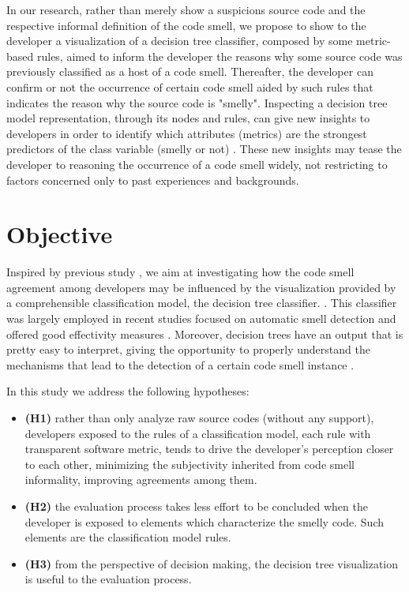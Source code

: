 In our research, rather than merely show a suspicions source code and the respective informal definition of the code smell, we propose to show to the developer a visualization of a decision tree classifier, composed by some metric-based rules, aimed to inform the developer the reasons why some source code was previously classified as a host of a code smell. Thereafter, the developer can confirm or not the occurrence of certain code smell aided by such rules that indicates the reason why the source code is "smelly". Inspecting a decision tree model representation, through its nodes and rules, can give new insights to developers in order to identify which attributes (metrics) are the strongest predictors of the class variable (smelly or not) \cite{freitas2014comprehensible}. These new insights may tease the developer to reasoning the occurrence of a code smell widely, not restricting to factors concerned only to past experiences and backgrounds.

\section{Objective}

Inspired by previous study \cite{hozano2018you}, we aim at investigating how the code smell agreement among developers may be influenced by the visualization provided by a comprehensible classification model, the decision tree classifier. \cite{freitas2014comprehensible}. This classifier was largely employed \cite{azeem2019machine} in recent studies focused on automatic smell detection and offered good effectivity measures \cite{amorim2015experience}.  Moreover, decision trees have an output that is pretty easy to interpret, giving the opportunity to properly understand the mechanisms that lead to the detection of a certain code smell instance \cite{azeem2019machine}. 

In this study we address the following hypotheses:
    \begin{itemize}
        \item \textbf{(H1)} rather than only analyze raw source codes (without any support), developers exposed to the rules of a classification model, each rule with transparent software metric, tends to drive the developer's perception closer to each other, minimizing the subjectivity inherited from code smell informality, improving agreements among them.
        \item \textbf{(H2)} the evaluation process takes less effort to be concluded when the developer is exposed to elements which characterize the smelly code. Such elements are the classification model rules.
        \item \textbf{(H3)} from the perspective of decision making, the decision tree visualization is useful to the evaluation process.
    \end{itemize}

